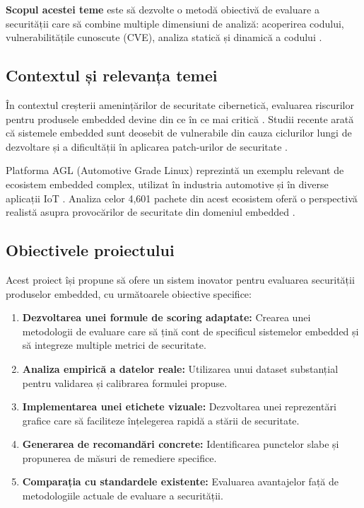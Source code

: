\documentclass[12pt,a4paper]{article}
\begin{document}
\textbf{Scopul acestei teme} este să dezvolte o metodă obiectivă de evaluare a securității care să combine multiple dimensiuni de analiză: acoperirea codului, vulnerabilitățile cunoscute (CVE), analiza statică și dinamică a codului \cite{scandariato2015static,chowdhury2018comparative}.

\subsection{Contextul și relevanța temei}

În contextul creșterii amenințărilor de securitate cibernetică, evaluarea riscurilor pentru produsele embedded devine din ce în ce mai critică \cite{checkoway2011comprehensive,miller2015remote}. Studii recente arată că sistemele embedded sunt deosebit de vulnerabile din cauza ciclurilor lungi de dezvoltare și a dificultății în aplicarea patch-urilor de securitate \cite{alves2016towards}.

Platforma AGL (Automotive Grade Linux) reprezintă un exemplu relevant de ecosistem embedded complex, utilizat în industria automotive și în diverse aplicații IoT \cite{agl2021platform}. Analiza celor 4,601 pachete din acest ecosistem oferă o perspectivă realistă asupra provocărilor de securitate din domeniul embedded \cite{koopman2010better}.

\subsection{Obiectivele proiectului}

Acest proiect își propune să ofere un sistem inovator pentru evaluarea securității produselor embedded, cu următoarele obiective specifice:

\begin{enumerate}[label=\arabic*.]
    \item \textbf{Dezvoltarea unei formule de scoring adaptate:} Crearea unei metodologii de evaluare care să țină cont de specificul sistemelor embedded și să integreze multiple metrici de securitate.
    
    \item \textbf{Analiza empirică a datelor reale:} Utilizarea unui dataset substanțial pentru validarea și calibrarea formulei propuse.
    
    \item \textbf{Implementarea unei etichete vizuale:} Dezvoltarea unei reprezentări grafice care să faciliteze înțelegerea rapidă a stării de securitate.
    
    \item \textbf{Generarea de recomandări concrete:} Identificarea punctelor slabe și propunerea de măsuri de remediere specifice.
    
    \item \textbf{Comparația cu standardele existente:} Evaluarea avantajelor față de metodologiile actuale de evaluare a securității.
\end{enumerate}
\end{document}
